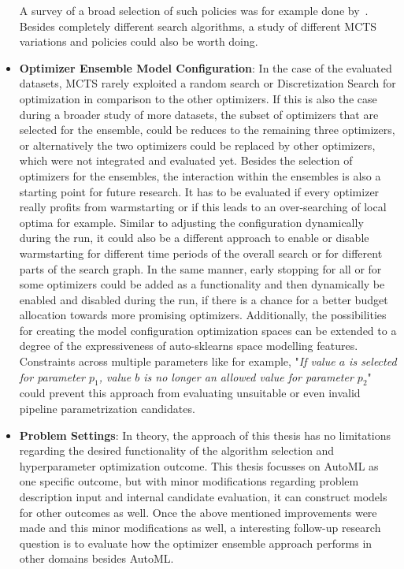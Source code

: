 \begin{itemize}
    A survey of a broad selection of such policies was for example done by~\textcite{Browne-Policies}.
    Besides completely different search algorithms, a study of different MCTS variations and policies could also be worth doing.
    \item \textbf{Optimizer Ensemble Model Configuration}: In the case of the evaluated datasets, MCTS rarely exploited a random search or Discretization Search for optimization in comparison to the other optimizers.
    If this is also the case during a broader study of more datasets, the subset of optimizers that are selected for the ensemble, could be reduces to the remaining three optimizers, or alternatively the two optimizers could be replaced by other optimizers, which were not integrated and evaluated yet.\newline
    Besides the selection of optimizers for the ensembles, the interaction within the ensembles is also a starting point for future research.
    It has to be evaluated if every optimizer really profits from warmstarting or if this leads to an over-searching of local optima for example.\newline
    Similar to adjusting the configuration dynamically during the run, it could also be a different approach to enable or disable warmstarting for different time periods of the overall search or for different parts of the search graph.
    In the same manner, early stopping for all or for some optimizers could be added as a functionality and then dynamically be enabled and disabled during the run, if there is a chance for a better budget allocation towards more promising optimizers.\newline
    Additionally, the possibilities for creating the model configuration optimization spaces can be extended to a degree of the expressiveness of auto-sklearns space modelling features.
    Constraints across multiple parameters like for example, "\textit{If value $a$ is selected for parameter $p_1$, value $b$ is no longer an allowed value for parameter $p_2$}" could prevent this approach from evaluating unsuitable or even invalid pipeline parametrization candidates.
    \item \textbf{Problem Settings}: In theory, the approach of this thesis has no limitations regarding the desired functionality of the algorithm selection and hyperparameter optimization outcome.
    This thesis focusses on AutoML as one specific outcome, but with minor modifications regarding problem description input and internal candidate evaluation, it can construct models for other outcomes as well.\newline
    Once the above mentioned improvements were made and this minor modifications as well, a interesting follow-up research question is to evaluate how the optimizer ensemble approach performs in other domains besides AutoML.
\end{itemize}
